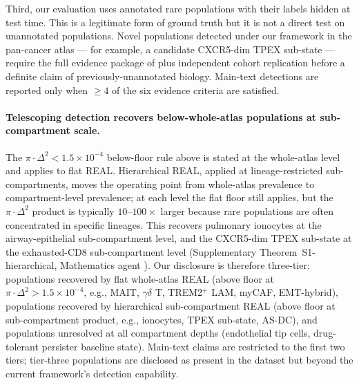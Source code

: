 Third, our evaluation uses annotated rare populations with their
labels hidden at test time. This is a legitimate form of ground
truth but it is not a direct test on unannotated populations.
Novel populations detected under our framework in the pan-cancer
atlas --- for example, a candidate CXCR5-dim TPEX sub-state
\citep{ourfig5} --- require the full evidence package of
 plus independent cohort replication
before a definite claim of previously-unannotated biology. Main-text
detections are reported only when $\geq 4$ of the six evidence
criteria are satisfied.

\paragraph*{Telescoping detection recovers below-whole-atlas populations at sub-compartment scale.}
The $\pi\cdot\Delta^2 < 1.5\times10^{-4}$ below-floor rule above is
stated at the whole-atlas level and applies to flat REAL. Hierarchical
REAL, applied at lineage-restricted sub-compartments, moves the
operating point from whole-atlas prevalence to compartment-level
prevalence; at each level the flat floor still applies, but the
$\pi\cdot\Delta^2$ product is typically $10$--$100\times$ larger
because rare populations are often concentrated in specific lineages.
This recovers pulmonary ionocytes at the airway-epithelial sub-compartment
level, and the CXCR5-dim TPEX sub-state at the exhausted-CD8 sub-compartment
level (Supplementary Theorem~S1-hierarchical, Mathematics agent
\citealp{math2026hierarchical}). Our disclosure is therefore
three-tier: populations recovered by flat whole-atlas REAL (above
floor at $\pi\cdot\Delta^2 > 1.5\times10^{-4}$, e.g., MAIT, $\gamma\delta$
T, TREM2$^+$ LAM, myCAF, EMT-hybrid), populations recovered by
hierarchical sub-compartment REAL (above floor at sub-compartment
product, e.g., ionocytes, TPEX sub-state, AS-DC), and populations
unresolved at all compartment depths (endothelial tip cells, drug-tolerant
persister baseline state). Main-text claims are restricted to the
first two tiers; tier-three populations are disclosed as present in
the dataset but beyond the current framework's detection capability.


